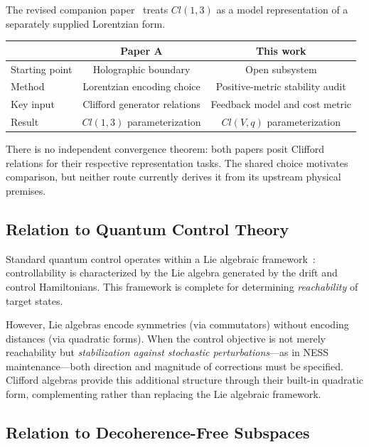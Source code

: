 \documentclass[12pt,a4paper,openany]{book}
\begin{document}
The revised companion paper~\cite{Liu2026QRAIF_A} treats $Cl(1,3)$ as a model representation of a separately supplied Lorentzian form.

\begin{center}
\begin{tabular}{@{}lcc@{}}
\toprule
& \textbf{Paper A} & \textbf{This work} \\
\midrule
Starting point & Holographic boundary & Open subsystem \\
Method & Lorentzian encoding choice & Positive-metric stability audit \\
Key input & Clifford generator relations & Feedback model and cost metric \\
Result & $Cl(1,3)$ parameterization & $Cl(V,q)$ parameterization \\
\bottomrule
\end{tabular}
\end{center}

There is no independent convergence theorem: both papers posit Clifford relations for their respective representation tasks.  The shared choice motivates comparison, but neither route currently derives it from its upstream physical premises.

\subsection{Relation to Quantum Control Theory}

Standard quantum control operates within a Lie algebraic framework~\cite{WisemanMilburn2009}: controllability is characterized by the Lie algebra generated by the drift and control Hamiltonians.
This framework is complete for determining \emph{reachability} of target states.

However, Lie algebras encode symmetries (via commutators) without encoding distances (via quadratic forms).
When the control objective is not merely reachability but \emph{stabilization against stochastic perturbations}---as in NESS maintenance---both direction and magnitude of corrections must be specified.
Clifford algebras provide this additional structure through their built-in quadratic form, complementing rather than replacing the Lie algebraic framework.

\subsection{Relation to Decoherence-Free Subspaces}
\end{document}
